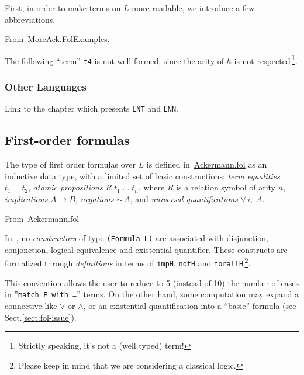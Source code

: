 First, in order to make terms on $L$ more readable, we introduce a few abbreviations.


From~\href{../theories/html/hydras.MoreAck.FolExamples.html}{MoreAck.FolExamples}.




The following ``term'' \texttt{t4} is not well formed, since the arity of $h$ is not respected\,\footnote{Strictly speaking, it's not a (well typed) term!}.


\subsubsection{Other Languages}

\begin{todo}
Link to the chapter which presents \texttt{LNT} and \texttt{LNN}.
\end{todo}

\subsection{First-order formulas}



The type of first order formulas over $L$ is defined 
in~\href{../theories/html/hydras.Ackermann.fol.html}{Ackermann.fol} as an inductive data type, with a limited set of basic constructions:
\emph{term equalities} $t_1=t_2$,
\emph{atomic propositions} $R\;t_1\;\dots\;t_n$, where $R$ is a relation symbol of arity $n$,
\emph{implications} $A \rightarrow B$,
\emph{negations} $\sim\,A$,
and \emph{universal quantifications} $\forall\,i,\;A$.

\vspace{6pt}

\noindent From~\href{../theories/html/hydras.Ackermann.fol.html}{Ackermann.fol}




\begin{remark}

In~\cite{Goedel}, no \emph{constructors} of type \texttt{(Formula L)} are associated with
disjunction, conjonction, logical equivalence and existential quantifier. These constructs are formalized through \emph{definitions} in terms of \texttt{impH}, \texttt{notH} and \texttt{forallH}\,\footnote{Please keep in mind that we are considering a classical logic.}.


This convention allows the user to reduce to 5 (instead of 10) the number of cases in ''\texttt{match F with \dots}'' terms. On the other hand, some computation may expand a connective like $\vee$ or
$\wedge$, or an existential quantification into a ``basic'' formula (see Sect.\vref{sect:fol-issue}).
\end{remark}

